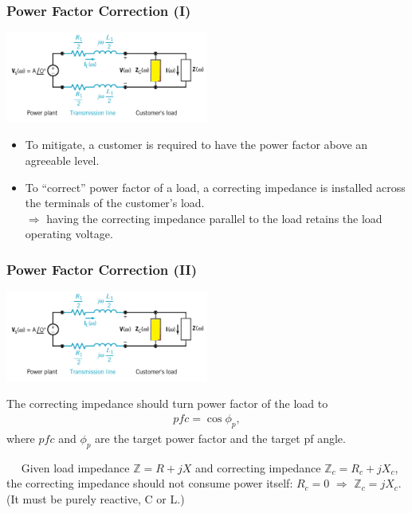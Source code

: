 \documentclass{beamer}
\begin{document}

\begin{frame}[fragile]
\frametitle{Power Factor Correction (I)}

\begin{center}
\includegraphics[width=0.5\textwidth]{src/pfc0.png}
\end{center}

\begin{itemize}
\item To mitigate, a customer is required to have the power factor above an agreeable level.
\item To ``correct'' power factor of a load, a correcting impedance is installed across the terminals of the customer's load.
\\
$\Rightarrow$ having the correcting impedance parallel to the load retains the load operating voltage.

\end{itemize}

\end{frame}


\begin{frame}[fragile]
\frametitle{Power Factor Correction (II)}

\vspace{-0.5cm}
\begin{center}
\includegraphics[width=0.5\textwidth]{src/pfc0.png}
\end{center}
\vspace{-0.5cm}

The correcting impedance should turn power factor of the load to
%
\begin{align*}
pfc = \cos \phi_p
\nonumber ,
\end{align*}
%
where $pfc$ and $\phi_p$ are the target power factor and  the target pf angle.

{\small
$\quad$ Given load impedance $\mathbb{Z} = R + jX$ and correcting impedance $\mathbb{Z}_c = R_c + jX_c$, the correcting impedance should not consume power itself: 
$R_c = 0$ $\Rightarrow$ 
$\mathbb{Z}_c = jX_c$.
(It must be purely reactive, C or L.)
}%

\end{frame}
\end{document}
